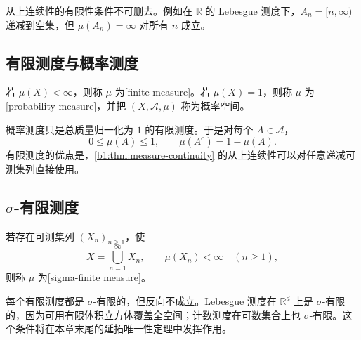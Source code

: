 从上连续性的有限性条件不可删去。例如在 \(\mathbb R\) 的 Lebesgue 测度下，\(A_n=[n,\infty)\) 递减到空集，但 \(\mu(A_n)=\infty\) 对所有 \(n\) 成立。

\subsection{有限测度与概率测度}
\label{b1:subsec:020104}

\begin{definition}
\label{b1:def:finite-probability-measure}
若 \(\mu(X)<\infty\)，则称 \(\mu\) 为[finite measure]。若 \(\mu(X)=1\)，则称 \(\mu\) 为[probability measure]，并把 \((X,\mathcal A,\mu)\) 称为概率空间。
\end{definition}

概率测度只是总质量归一化为 \(1\) 的有限测度。于是对每个 \(A\in\mathcal A\)，
\[
0\leq\mu(A)\leq1,
\qquad
\mu(A^{\mathrm c})=1-\mu(A).
\]
有限测度的优点是，\cref{b1:thm:measure-continuity} 的从上连续性可以对任意递减可测集列直接使用。

\subsection{\texorpdfstring{\(\sigma\)}{σ}-有限测度}
\label{b1:subsec:020105}

\begin{definition}
\label{b1:def:sigma-finite-measure}
若存在可测集列 \((X_n)_{n\geq1}\)，使
\[
X=\bigcup_{n=1}^{\infty}X_n,
\qquad
\mu(X_n)<\infty\quad(n\geq1),
\]
则称 \(\mu\) 为[sigma-finite measure]。
\end{definition}

每个有限测度都是 \(\sigma\)-有限的，但反向不成立。Lebesgue 测度在 \(\mathbb R^d\) 上是 \(\sigma\)-有限的，因为可用有限体积立方体覆盖全空间；计数测度在可数集合上也 \(\sigma\)-有限。这个条件将在本章末尾的延拓唯一性定理中发挥作用。
